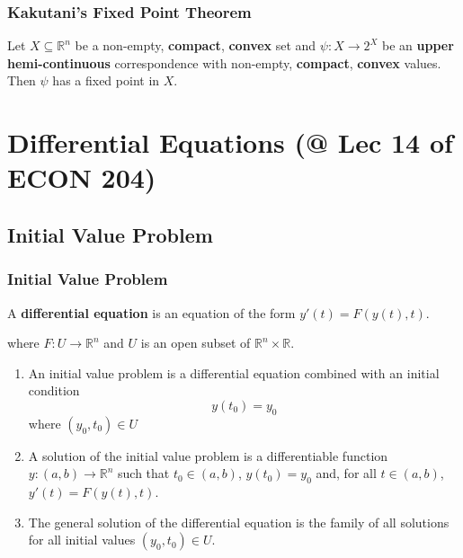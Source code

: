 \documentclass[11pt]{elegantbook}
\begin{document}
\subsection{Kakutani's Fixed Point Theorem}
\begin{theorem}
    Let $X \subseteq \mathbb{R}^n$ be a non-empty, \textbf{compact}, \textbf{convex} set and $\psi : X \rightarrow 2^X$ be an \textbf{upper hemi-continuous} correspondence with non-empty, \textbf{compact}, \textbf{convex} values. Then $\psi$ has a fixed point in $X$.
\end{theorem}


\chapter{Differential Equations \small{(@ Lec 14 of ECON 204)}}
\section{Initial Value Problem}
\subsection{Initial Value Problem}
\begin{definition}
    \normalfont
    A \textbf{differential equation} is an equation of the form $y'(t)=F(y(t), t)$.
\end{definition}
where $F : U \rightarrow \mathbb{R}^n$ and $U$ is an open subset of $\mathbb{R}^n\times \mathbb{R}$.

\begin{definition}
    \normalfont
    \begin{enumerate}
        \item An initial value problem is a differential equation combined with an initial condition $$y(t_0)=y_0$$
        where $(y_0,t_0)\in U$
        \item A solution of the initial value problem is a differentiable function $y : (a, b) \rightarrow \mathbb{R}^n$ such that $t_0 \in (a, b)$, $y(t_0) = y_0$ and, for all $t \in (a, b)$, $y'(t)=F(y(t), t)$.
        \item The general solution of the differential equation is the family of all solutions for all initial values $(y_0, t_0) \in U$.
    \end{enumerate}
\end{definition}
\end{document}

